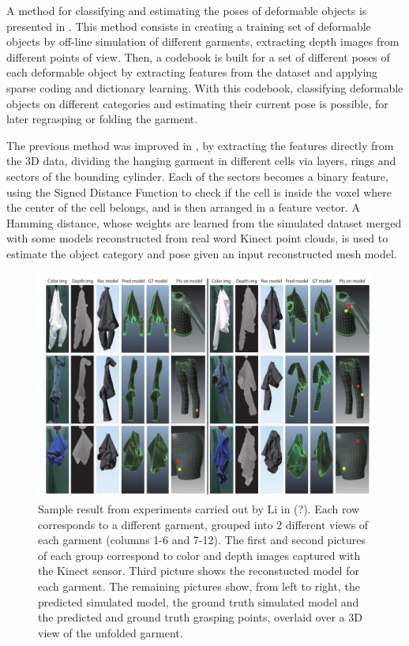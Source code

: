 A method for classifying and estimating the poses of deformable objects is presented in \cite{Li2014ICRA}. This method consists in creating a training set of deformable objects by off-line simulation of different garments, extracting depth images from different points of view. Then, a codebook is built for a set of different poses of each deformable object by extracting features from the dataset and applying sparse coding and dictionary learning. With this codebook, classifying deformable objects on different categories and estimating their current pose is possible, for later regrasping or folding the garment.

The previous method was improved in \cite{Li2014IROS}, by extracting the features directly from the 3D data, dividing the hanging garment in different cells via layers, rings and sectors of the bounding cylinder. Each of the sectors becomes a binary feature, using the Signed Distance Function to check if the cell is inside the voxel where the center of the cell belongs, and is then arranged in a feature vector. A Hamming distance, whose weights are learned from the simulated dataset merged with some models reconstructed from real word Kinect point clouds, is used to estimate the object category and pose given an input reconstructed mesh model.

\begin{figure}[thpb]
    \centering
    \includegraphics[width=\textwidth]{figures/SOTA_Li_2014-2.png}
    \caption{Sample result from experiments carried out by Li in  (?). Each row corresponds to a different garment, grouped into 2 different views of each garment (columns 1-6 and 7-12). The first and second pictures of each group correspond to color and depth images captured with the Kinect sensor. Third picture shows the reconstucted model for each garment. The remaining pictures show, from left to right, the predicted simulated model, the ground truth simulated model and the predicted and ground truth grasping points, overlaid over a 3D view of the unfolded garment.
    }
    \label{fig:SOTA_Li_2014}
\end{figure}

